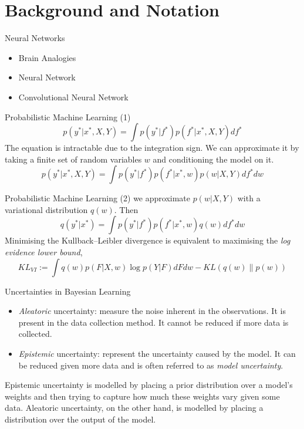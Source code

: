 \documentclass{beamer}
\begin{document}
\section{Background and Notation}
\begin{frame}{Neural Networks}
  \begin{itemize}
    \item<1-> Brain Analogies
    \item<1-> Neural Network
    \item<1-> Convolutional Neural Network
  \end{itemize}
\end{frame}
\begin{frame}{Probabilistic Machine Learning (1)}
  \begin{equation}
    p(y^*|x^*, X, Y) = \int p(y^*|f^*)p(f^*|x^*, X, Y) df^*
  \end{equation}
  The equation is intractable due to the integration sign. We can approximate it by taking a finite set of random variables $w$ and conditioning the model on it.
  \[
    p(y^*|x^*, X, Y) = \int p(y^*|f^*)p(f^*|x^*, w)p(w|X, Y) df^*dw
  \]
\end{frame}
\begin{frame}{Probabilistic Machine Learning (2)}
  we approximate $p(w|X, Y)$ with a variational distribution $q(w)$. Then
  \begin{equation}
    q(y^*|x^*) = \int p(y^*|f^*)p(f^*|x^*, w)q(w)df^*dw
  \end{equation}
  Minimising the Kullback–Leibler divergence is equivalent to maximising the \textit{log evidence lower bound},
  \begin{equation}
    KL_{VI} := \int q(w)p(F|X, w) \log p(Y|F) dFdw - KL(q(w)\|p(w))
  \end{equation}
\end{frame}
\begin{frame}{Uncertainties in Bayesian Learning}
  \begin{itemize}
    \item<1-> \textit{Aleatoric} uncertainty: measure the noise inherent in the observations. 
    It is present in the data collection method. It cannot be reduced if more data is collected.
    \item<1-> \textit{Epistemic} uncertainty: represent the uncertainty caused by the model.
    It can be reduced given more data and is often referred to as \textit{model uncertainty}.
  \end{itemize}
  Epistemic uncertainty is modelled by placing a prior distribution over a model’s weights and then trying to capture how much these weights
vary given some data. Aleatoric uncertainty, on the other hand, is modelled by placing a
distribution over the output of the model.
\end{frame}
\end{document}
